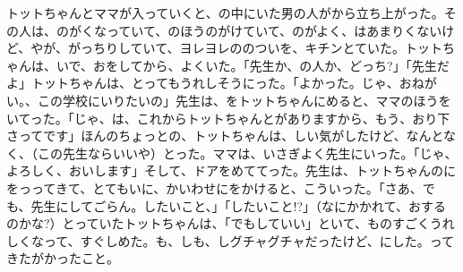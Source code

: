トットちゃんとママが入っていくと、の中にいた男の人がから立ち上がった。その人は、のがくなっていて、のほうのがけていて、のがよく、はあまりくないけど、やが、がっちりしていて、ヨレヨレののついを、キチンとていた。トットちゃんは、いで、おをしてから、よくいた。「先生か、の人か、どっち?」「先生だよ」トットちゃんは、とってもうれしそうにった。「よかった。じゃ、おねがい。、この学校にいりたいの」先生は、をトットちゃんにめると、ママのほうをいてった。「じゃ、は、これからトットちゃんとがありますから、もう、おり下さってです」ほんのちょっとの、トットちゃんは、しい気がしたけど、なんとなく、（この先生ならいいや）とった。ママは、いさぎよく先生にいった。「じゃ、よろしく、おいします」そして、ドアをめててった。先生は、トットちゃんのにをっってきて、とてもいに、かいわせにをかけると、こういった。「さあ、でも、先生にしてごらん。したいこと、」「したいこと!?」（なにかかれて、おするのかな?）とっていたトットちゃんは、「でもしていい」といて、ものすごくうれしくなって、すぐしめた。も、しも、しグチャグチャだったけど、にした。ってきたがかったこと。

